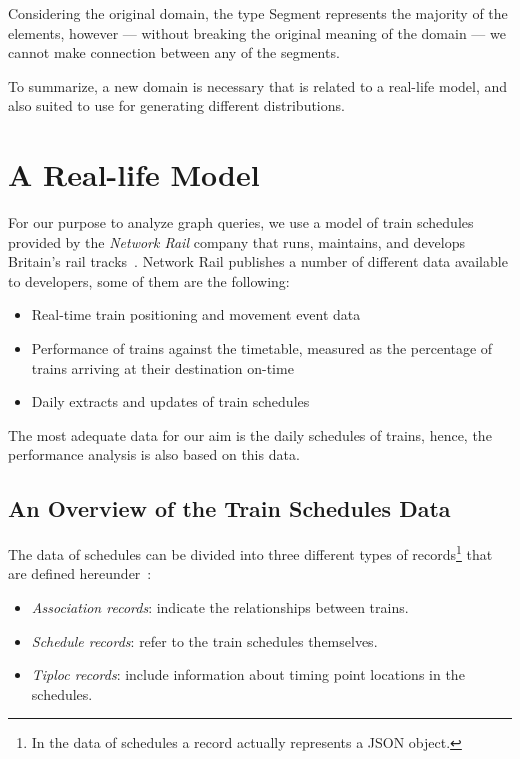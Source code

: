 Considering the original domain, the type \textsf{Segment} represents the majority of the elements, however --- without breaking the original meaning of the domain --- we cannot make connection between any of the segments.

To summarize, a new domain is necessary that is related to a real-life model, and also suited to use for generating different distributions.

\section{A Real-life Model}

For our purpose to analyze graph queries, we use a model of train schedules provided by the \textit{Network Rail} company that runs, maintains, and develops Britain's rail tracks~\cite{network_rail}. Network Rail publishes a number of different data available to developers, some of them are the following:
\begin{itemize}
	\item{Real-time train positioning and movement event data}
	\item{Performance of trains against the timetable, measured as the percentage of trains arriving at their destination on-time}
	\item{Daily extracts and updates of train schedules}
\end{itemize}

The most adequate data for our aim is the daily schedules of trains, hence, the performance analysis is also based on this data.

\subsection{An Overview of the Train Schedules Data}\label{sec:schedules_overview}
The data of schedules can be divided into three different types of records\footnote{In the data of schedules a record actually represents a JSON object.} that are defined hereunder~\cite{schedules_data}:
\begin{itemize}
	\item{\textit{Association records}}: indicate the relationships between trains.
	\item{\textit{Schedule records}}: refer to the train schedules themselves.
	\item{\textit{Tiploc records}}: include information about timing point locations in the schedules.
\end{itemize}

